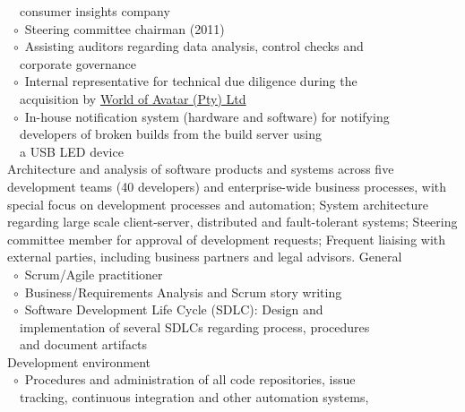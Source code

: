 \documentclass[10pt,a4paper,final]{columncv}
\begin{document}
\begin{cvenv}
{         ~\phantom{$\circ$}~consumer insights company \\
         ~$\circ$~Steering committee chairman (2011) \\
         ~$\circ$~Assisting auditors regarding data analysis, control checks and \\
         ~\phantom{$\circ$}~corporate governance \\
         ~$\circ$~Internal representative for technical due diligence during the \\
         ~\phantom{$\circ$}~acquisition by \href{http://www.worldofavatar.com/}{World of Avatar (Pty) Ltd} \\
         ~$\circ$~In-house notification system (hardware and software) for notifying \\
         ~\phantom{$\circ$}~developers of broken builds from the build server using \\
         ~\phantom{$\circ$}~a USB LED device
         \\}
         {Architecture and analysis of software products and systems across five 
          development teams (40 developers) and enterprise-wide business processes, with 
          special focus on development processes and automation; System architecture 
          regarding large scale client-server, distributed and fault-tolerant systems; 
          Steering committee member for approval of development requests; Frequent 
          liaising with external parties, including business partners and legal advisors.}
         {General \\
          ~$\circ$~Scrum/Agile practitioner \\
          ~$\circ$~Business/Requirements Analysis and Scrum story writing \\
          ~$\circ$~Software Development Life Cycle (SDLC): Design and \\
          ~\phantom{$\circ$}~implementation of several SDLCs regarding process, procedures \\
          ~\phantom{$\circ$}~and document artifacts \\
          Development environment \\
          ~$\circ$~Procedures and administration of all code repositories, issue \\ 
          ~\phantom{$\circ$}~tracking, continuous integration and other automation systems, \\
}
\end{cvenv}
\end{document}
